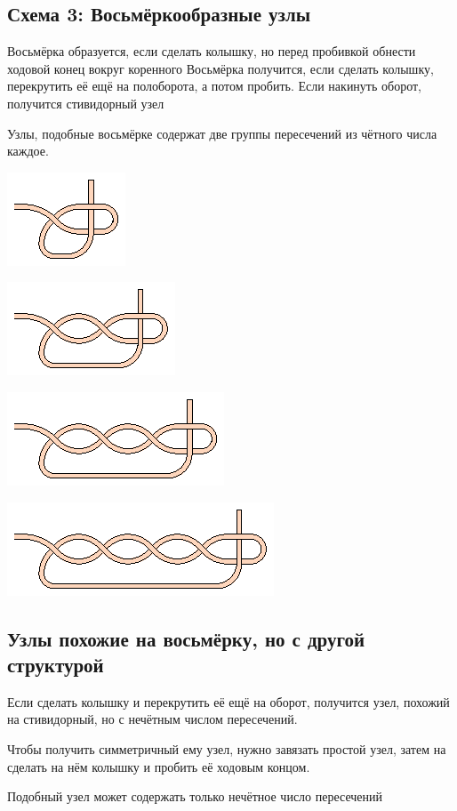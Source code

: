 \subsection{Схема 3: Восьмёркообразные узлы}

Восьмёрка образуется, если сделать колышку, но перед пробивкой обнести ходовой конец вокруг коренного
Восьмёрка получится, если сделать колышку, перекрутить её ещё на полоборота, а потом пробить.
Если накинуть оборот, получится стивидорный узел

Узлы, подобные восьмёрке содержат две группы пересечений из чётного числа каждое.

\graphicspath{{\currentpath}}

\includegraphics[scale=2]{images/stividor-0.eps}

\includegraphics[scale=2]{images/stividor-1.eps}

\includegraphics[scale=2]{images/stividor-2.eps}

\includegraphics[scale=2]{images/stividor-3.eps}

\subsection{Узлы похожие на восьмёрку, но с другой структурой}

Если сделать колышку и перекрутить её ещё на оборот, получится узел, похожий на стивидорный, но с нечётным числом пересечений.

Чтобы получить симметричный ему узел, нужно завязать простой узел, затем на сделать на нём колышку и пробить её ходовым концом.

Подобный узел может содержать только нечётное число пересечений

